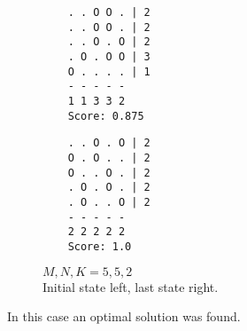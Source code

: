 \begin{figure}[h!]
\begin{multicols}{2}
    \begin{verbatim}
    . . O O . | 2
    . . O O . | 2
    . . O . O | 2
    . O . O O | 3
    O . . . . | 1
    - - - - -
    1 1 3 3 2
    Score: 0.875
    \end{verbatim}
    \columnbreak
    \begin{verbatim}
    . . O . O | 2
    O . O . . | 2
    O . . O . | 2
    . O . O . | 2
    . O . . O | 2
    - - - - -
    2 2 2 2 2
    Score: 1.0
    \end{verbatim}
    \end{multicols}
\caption{$M, N, K = 5, 5, 2$\\
Initial state left, last state right.}
\end{figure}
In this case an optimal solution was found.